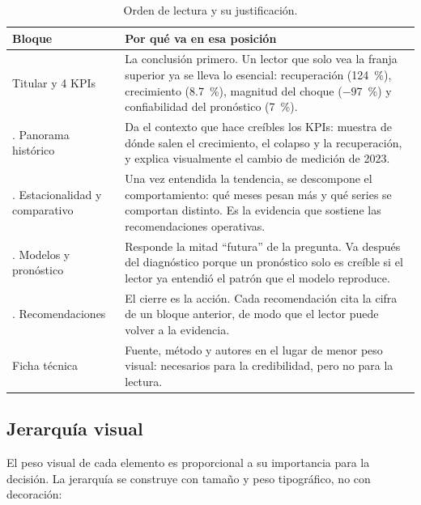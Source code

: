\documentclass[12pt,letterpaper]{article}
\begin{document}
\begin{table}[H]
\centering
\small
\begin{tabularx}{\textwidth}{>{\raggedright\arraybackslash}p{3.6cm}>{\raggedright\arraybackslash}X}
\toprule
\textbf{Bloque} & \textbf{Por qué va en esa posición} \\
\midrule
Titular y 4 KPIs & La conclusión primero. Un lector que solo vea la franja superior ya se
lleva lo esencial: recuperación (124~\%), crecimiento (8.7~\%), magnitud del choque ($-97$~\%) y
confiabilidad del pronóstico (7~\%). \\
1. Panorama histórico & Da el contexto que hace creíbles los KPIs: muestra de dónde salen el
crecimiento, el colapso y la recuperación, y explica visualmente el cambio de medición de 2023. \\
2. Estacionalidad y comparativo & Una vez entendida la tendencia, se descompone el
comportamiento: qué meses pesan más y qué series se comportan distinto. Es la evidencia que
sostiene las recomendaciones operativas. \\
3. Modelos y pronóstico & Responde la mitad ``futura'' de la pregunta. Va después del
diagnóstico porque un pronóstico solo es creíble si el lector ya entendió el patrón que el modelo
reproduce. \\
4. Recomendaciones & El cierre es la acción. Cada recomendación cita la cifra de un bloque
anterior, de modo que el lector puede volver a la evidencia. \\
Ficha técnica & Fuente, método y autores en el lugar de menor peso visual: necesarios para la
credibilidad, pero no para la lectura. \\
\bottomrule
\end{tabularx}
\caption{Orden de lectura y su justificación.}
\end{table}

\subsection{Jerarquía visual}

El peso visual de cada elemento es proporcional a su importancia para la decisión. La
jerarquía se construye con tamaño y peso tipográfico, no con decoración:
\end{document}
